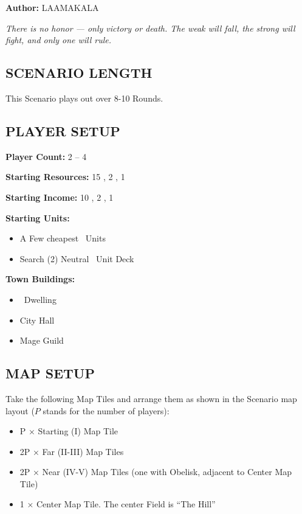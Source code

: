 
\begin{multicols*}{2}

\textbf{Author:} LAAMAKALA

\textit{There is no honor — only victory or death. The weak will fall, the strong will fight, and only one will rule.}

\subsection*{\MakeUppercase{Scenario Length}}
This Scenario plays out over 8-10 Rounds.

\subsection*{\MakeUppercase{Player Setup}}
\textbf{Player Count:} 2 -- 4

\textbf{Starting Resources:} 15 , 2 , 1 

\textbf{Starting Income:} 10 , 2 , 1 

\textbf{Starting Units:}
\begin{itemize}
  \item A Few cheapest \silver\ Units
  \item Search (2) Neutral \bronze\ Unit Deck
\end{itemize}

\textbf{Town Buildings:}
\begin{itemize}
  \item \bronze\ Dwelling
  \item City Hall
  \item Mage Guild
\end{itemize}

\subsection*{\MakeUppercase{Map Setup}}
Take the following Map Tiles and arrange them as shown in the Scenario map layout ($P$ stands for the number of players):

\begin{itemize}
  \item P × Starting (I) Map Tile
  \item 2P × Far (II-III) Map Tiles
  \item 2P × Near (IV-V) Map Tiles (one with Obelisk, adjacent to Center Map Tile)
  \item 1 × Center Map Tile. The center Field is ``The Hill''
\end{itemize}


\end{multicols*}
